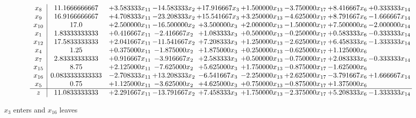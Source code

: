 \documentclass[10pt]{article}
\begin{document}
 \[\begin{array}{c| c c@{\hskip 2pt} c@{\hskip 2pt} c@{\hskip 2pt} c@{\hskip 2pt} c@{\hskip 2pt} c@{\hskip 2pt} c@{\hskip 2pt} }
 x_{8}   &  11.1666666667 & + 3.583333 x_{11} & -14.583333 x_{2} & + 17.916667 x_{3} & + 1.500000 x_{13} & -3.750000 x_{17} & + 8.416667 x_{6} & + 0.333333 x_{14}\\
 x_{9}   &  16.9166666667 & + 4.708333 x_{11} & -23.208333 x_{2} & + 15.541667 x_{3} & + 3.250000 x_{13} & -4.625000 x_{17} & + 8.791667 x_{6} & -1.666667 x_{14}\\
 x_{10}   &  17.0 & + 2.500000 x_{11} & -16.500000 x_{2} & + 3.500000 x_{3} & + 2.000000 x_{13} & -1.500000 x_{17} & + 7.500000 x_{6} & -2.000000 x_{14}\\
 x_{1}   &  1.83333333333 & + 0.416667 x_{11} & -2.416667 x_{2} & + 1.083333 x_{3} & + 0.500000 x_{13} & -0.250000 x_{17} & + 0.583333 x_{6} & -0.333333 x_{14}\\
 x_{12}   &  17.5833333333 & + 2.041667 x_{11} & -11.541667 x_{2} & + 7.208333 x_{3} & + 1.250000 x_{13} & -2.625000 x_{17} & + 6.458333 x_{6} & -1.333333 x_{14}\\
 x_{4}   &  1.25 & + 0.375000 x_{11} & -1.875000 x_{2} & + 1.875000 x_{3} & + 0.250000 x_{13} & -0.625000 x_{17} & + 1.125000 x_{6} &   \\
 x_{7}   &  2.83333333333 & + 0.916667 x_{11} & -3.916667 x_{2} & + 2.583333 x_{3} & + 0.500000 x_{13} & -0.750000 x_{17} & + 2.083333 x_{6} & -0.333333 x_{14}\\
 x_{15}   &  8.75 & + 2.125000 x_{11} & -7.625000 x_{2} & + 5.625000 x_{3} & + 1.750000 x_{13} & -0.875000 x_{17} & -1.625000 x_{6} &   \\
 x_{16}   &  0.0833333333333 & -2.708333 x_{11} & + 13.208333 x_{2} & -6.541667 x_{3} & -2.250000 x_{13} & + 2.625000 x_{17} & -3.791667 x_{6} & + 1.666667 x_{14}\\
 x_{5}   &  0.75 & + 1.125000 x_{11} & -3.625000 x_{2} & + 4.625000 x_{3} & + 0.750000 x_{13} & -0.875000 x_{17} & + 1.375000 x_{6} &   \\
\hline
z    &  11.0833333333 & + 2.291667 x_{11} & -13.791667 x_{2} & + 7.458333 x_{3} & + 1.750000 x_{13} & -2.375000 x_{17} & + 5.208333 x_{6} & -1.333333 x_{14}\\
\end{array}\]


 $ x_{3} $ enters and $ x_{16} $ leaves 
\end{document}
